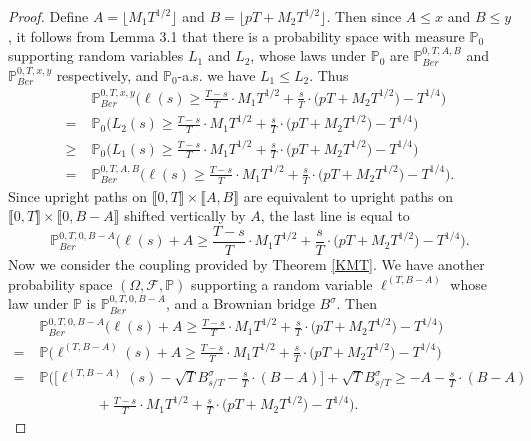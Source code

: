 \begin{proof}
	Define $A = \lfloor M_1T^{1/2}\rfloor$ and $B = \lfloor pT + M_2 T^{1/2}\rfloor$. Then since $A\leq x$ and $B\leq y$, it follows from Lemma 3.1 that there is a probability space with measure $\mathbb{P}_0$ supporting random variables $L_1$ and $L_2$, whose laws under $\mathbb{P}_0$ are $\mathbb{P}^{0,T,A,B}_{Ber}$ and $\mathbb{P}^{0,T,x,y}_{Ber}$ respectively, and $\mathbb{P}_0$-a.s. we have $L_1\leq L_2$. Thus
	\begin{align*}
	&\mathbb{P}^{0,T,x,y}_{Ber}\Big( \ell(s)  \geq \frac{T-s}{T} \cdot M_1 T^{1/2} + \frac{s}{T} \cdot \big(p T + M_2 T^{1/2}\big) - T^{1/4} \Big)\\
	= \; & \mathbb{P}_0\Big( L_2(s)  \geq \frac{T-s}{T} \cdot M_1 T^{1/2} + \frac{s}{T} \cdot \big(p T + M_2 T^{1/2}\big) - T^{1/4} \Big)\\
	\geq \; & \mathbb{P}_0\Big( L_1(s)  \geq \frac{T-s}{T} \cdot M_1 T^{1/2} + \frac{s}{T} \cdot \big(p T + M_2 T^{1/2}\big) - T^{1/4} \Big)\\
	= \; & \mathbb{P}^{0,T,A,B}_{Ber}\Big( \ell(s)  \geq \frac{T-s}{T} \cdot M_1 T^{1/2} + \frac{s}{T} \cdot \big(p T + M_2 T^{1/2}\big) - T^{1/4} \Big).
	\end{align*}
	Since upright paths on $\llbracket 0,T\rrbracket \times \llbracket A,B\rrbracket$ are equivalent to upright paths on $\llbracket 0,T\rrbracket \times \llbracket 0, B-A\rrbracket$ shifted vertically by $A$, the last line is equal to
	\[
	\mathbb{P}^{0,T,0,B-A}_{Ber}\Big( \ell(s) + A  \geq \frac{T-s}{T} \cdot M_1 T^{1/2} + \frac{s}{T} \cdot \big(p T + M_2 T^{1/2}\big) - T^{1/4} \Big).
	\]
	Now we consider the coupling provided by Theorem \ref{KMT}. We have another probability space $(\Omega,\mathcal{F},\mathbb{P})$ supporting a random variable $\ell^{(T,B-A)}$ whose law under $\mathbb{P}$ is $\mathbb{P}^{0,T,0,B-A}_{Ber}$, and a Brownian bridge $B^\sigma$. Then 
	\begin{align*}
	&\mathbb{P}^{0,T,0,B-A}_{Ber}\Big( \ell(s) + A  \geq \frac{T-s}{T} \cdot M_1 T^{1/2} + \frac{s}{T} \cdot \big(p T + M_2 T^{1/2}\big) - T^{1/4} \Big)\\
	= \; & \mathbb{P}\Big( \ell^{(T,B-A)}(s) + A \geq \frac{T-s}{T} \cdot M_1 T^{1/2} + \frac{s}{T} \cdot \big(p T + M_2 T^{1/2}\big) - T^{1/4} \Big)\\
	= \; & \mathbb{P}\Big( \Big[\ell^{(T,B-A)}(s) - \sqrt{T} B^\sigma_{s/T} - \frac{s}{T}\cdot(B-A)\Big] + \sqrt{T}B^\sigma_{s/T} \geq -A-\frac{s}{T}\cdot(B-A) \\
	&\qquad\qquad + \frac{T-s}{T} \cdot M_1 T^{1/2} + \frac{s}{T} \cdot \big(p T + M_2 T^{1/2}\big) - T^{1/4} \Big).

\end{align*}
\end{proof}
